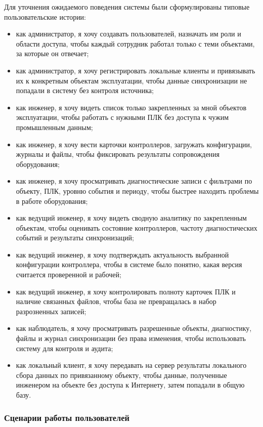 Для уточнения ожидаемого поведения системы были сформулированы типовые пользовательские истории:
\begin{itemize}
    \item как администратор, я хочу создавать пользователей, назначать им роли и области доступа, чтобы каждый сотрудник работал только с теми объектами, за которые он отвечает;
    \item как администратор, я хочу регистрировать локальные клиенты и привязывать их к конкретным объектам эксплуатации, чтобы данные синхронизации не попадали в систему без контроля источника;
    \item как инженер, я хочу видеть список только закрепленных за мной объектов эксплуатации, чтобы работать с нужными ПЛК без доступа к чужим промышленным данным;
    \item как инженер, я хочу вести карточки контроллеров, загружать конфигурации, журналы и файлы, чтобы фиксировать результаты сопровождения оборудования;
    \item как инженер, я хочу просматривать диагностические записи с фильтрами по объекту, ПЛК, уровню события и периоду, чтобы быстрее находить проблемы в работе оборудования;
    \item как ведущий инженер, я хочу видеть сводную аналитику по закрепленным объектам, чтобы оценивать состояние контроллеров, частоту диагностических событий и результаты синхронизаций;
    \item как ведущий инженер, я хочу подтверждать актуальность выбранной конфигурации контроллера, чтобы в системе было понятно, какая версия считается проверенной и рабочей;
    \item как ведущий инженер, я хочу контролировать полноту карточек ПЛК и наличие связанных файлов, чтобы база не превращалась в набор разрозненных записей;
    \item как наблюдатель, я хочу просматривать разрешенные объекты, диагностику, файлы и журнал синхронизации без права изменения, чтобы использовать систему для контроля и аудита;
    \item как локальный клиент, я хочу передавать на сервер результаты локального сбора данных по привязанному объекту, чтобы данные, полученные инженером на объекте без доступа к Интернету, затем попадали в общую базу.
\end{itemize}

\subsubsection{Сценарии работы пользователей}


